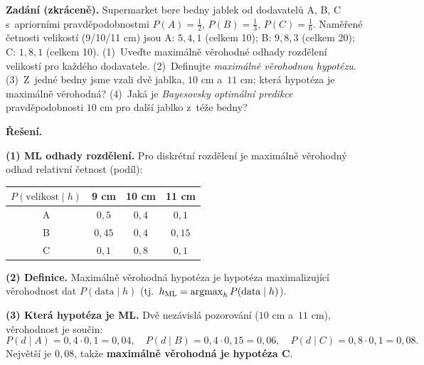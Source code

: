 \begin{priklad}
\par
\textbf{Zadání (zkráceně).} Supermarket bere bedny jablek od dodavatelů A, B, C s~apriorními pravděpodobnostmi $P(A)=\tfrac12$, $P(B)=\tfrac13$, $P(C)=\tfrac16$. Naměřené četnosti velikostí (9/10/11 cm) jsou A: $5,4,1$ (celkem 10); B: $9,8,3$ (celkem 20); C: $1,8,1$ (celkem 10). (1)~Uveďte maximálně věrohodné odhady rozdělení velikostí pro každého dodavatele. (2)~Definujte \emph{maximálně věrohodnou hypotézu}. (3)~Z~jedné bedny jsme vzali dvě jablka, $10$ cm a~$11$ cm; která hypotéza je maximálně věrohodná? (4)~Jaká je \emph{Bayesovsky optimální predikce} pravděpodobnosti $10$ cm pro další jablko z~téže bedny?

\medskip
\textbf{Řešení.}

\textbf{(1) ML odhady rozdělení.} Pro diskrétní rozdělení je maximálně věrohodný odhad relativní četnost (podíl):
\begin{center}\small
\begin{tabular}{c|ccc}
\toprule
$P(\text{velikost}\mid h)$ & 9 cm & 10 cm & 11 cm \\
\midrule
A & $0{,}5$  & $0{,}4$ & $0{,}1$ \\
B & $0{,}45$ & $0{,}4$ & $0{,}15$ \\
C & $0{,}1$  & $0{,}8$ & $0{,}1$ \\
\bottomrule
\end{tabular}
\end{center}

\textbf{(2) Definice.} Maximálně věrohodná hypotéza je hypotéza maximalizující věrohodnost dat $P(\text{data}\mid h)$ (tj.\ $h_{\mathrm{ML}}=\operatorname*{argmax}_h P(\text{data}\mid h)$).

\textbf{(3) Která hypotéza je ML.} Dvě nezávislá pozorování ($10$ cm a~$11$ cm), věrohodnost je součin:
\[ P(d\mid A)=0{,}4\cdot 0{,}1=0{,}04,\quad P(d\mid B)=0{,}4\cdot 0{,}15=0{,}06,\quad P(d\mid C)=0{,}8\cdot 0{,}1=0{,}08. \]
Největší je $0{,}08$, takže \textbf{maximálně věrohodná je hypotéza C}.


\end{priklad}

